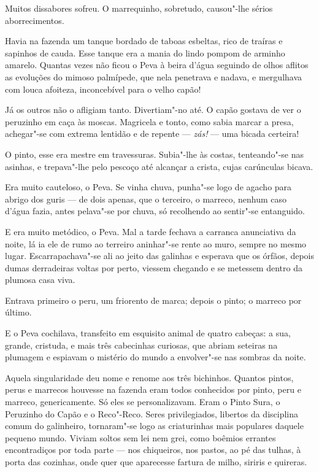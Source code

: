 Muitos dissabores sofreu. O marrequinho, sobretudo, causou"-lhe sérios
aborrecimentos.

Havia na fazenda um tanque bordado de taboas esbeltas, rico de traíras e
sapinhos de cauda. Esse tanque era a mania do lindo pompom de arminho
amarelo. Quantas vezes não ficou o Peva à beira d'água seguindo de olhos
aflitos as evoluções do mimoso palmípede, que nela penetrava e nadava, e
mergulhava com louca afoiteza, inconcebível para o velho capão!

Já os outros não o afligiam tanto. Divertiam"-no até. O capão gostava de
ver o peruzinho em caça às moscas. Magricela e tonto, como sabia marcar
a presa, achegar"-se com extrema lentidão e de repente --- \emph{zás!}
--- uma bicada certeira!

O pinto, esse era mestre em travessuras. Subia"-lhe às costas,
tenteando"-se nas asinhas, e trepava"-lhe pelo pescoço até alcançar a
crista, cujas carúnculas bicava.

Era muito cauteloso, o Peva. Se vinha chuva, punha"-se logo de agacho
para abrigo dos guris --- de dois apenas, que o terceiro, o marreco,
nenhum caso d'água fazia, antes pelava"-se por chuva, só recolhendo ao
sentir"-se entanguido.

E era muito metódico, o Peva. Mal a tarde fechava a carranca anunciativa
da noite, lá ia ele de rumo ao terreiro aninhar"-se rente ao muro, sempre
no mesmo lugar. Escarrapachava"-se ali ao jeito das galinhas e esperava
que os órfãos, depois dumas derradeiras voltas por perto, viessem
chegando e se metessem dentro da plumosa casa viva.

Entrava primeiro o peru, um friorento de marca; depois o pinto; o
marreco por último.

E o Peva cochilava, transfeito em esquisito animal de quatro cabeças: a
sua, grande, cristuda, e mais três cabecinhas curiosas, que abriam
seteiras na plumagem e espiavam o mistério do mundo a envolver"-se nas
sombras da noite.

Aquela singularidade deu nome e renome aos três bichinhos. Quantos
pintos, perus e marrecos houvesse na fazenda eram todos conhecidos por
pinto, peru e marreco, genericamente. Só eles se personalizavam. Eram o
Pinto Sura, o Peruzinho do Capão e o Reco"-Reco. Seres privilegiados,
libertos da disciplina comum do galinheiro, tornaram"-se logo as
criaturinhas mais populares daquele pequeno mundo. Viviam soltos sem lei
nem grei, como boêmios errantes encontradiços por toda parte --- nos
chiqueiros, nos pastos, ao pé das tulhas, à porta das cozinhas, onde
quer que aparecesse fartura de milho, siriris e quireras.


